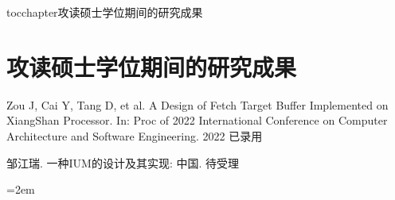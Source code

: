 
\newenvironment{thepublications}{\wuhao\song}

\addcontentsline{toc}{chapter}{攻读硕士学位期间的研究成果}%
\chapter*{\centering\xiaosan\hei\bfseries 攻读硕士学位期间的研究成果}

\begin{thepublications}

\setlength{\parindent}{0em}
\begin{publist}
	\item Zou J, Cai Y, Tang D, et al. A Design of Fetch Target Buffer Implemented on XiangShan Processor. In: Proc of 2022 International Conference on Computer Architecture and Software Engineering. 2022 已录用
	\item 邹江瑞. 一种IUM的设计及其实现: 中国. 待受理
\end{publist}

\vfill
{}\hangindent=2em\noindent

\setlength{\parindent}{2em}

\end{thepublications}

